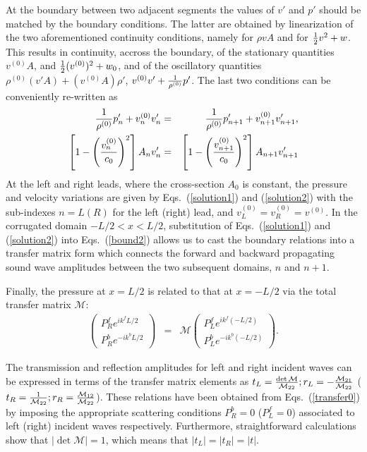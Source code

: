 \documentclass[aps,prl,twocolumn,groupedaddress,amsmath,amssymb]{revtex4}
\begin{document}
At the boundary between two adjacent segments the values of $v'$ and $p'$ should be matched by the boundary conditions. The latter are
obtained by linearization of the two aforementioned continuity conditions, namely for $\rho vA$ and for ${1\over 2} v^2+w$. This results
in continuity, accross the boundary, of the stationary quantities $v^{(0)} A $, and ${1\over 2} (v^{(0)})^2+w_0$, and of the oscillatory quantities
$\rho^{(0)} (v' A)+(v^{(0)} A) \rho'$, $v^{(0)}v'+{1\over \rho^{(0)}} p'$. The last two conditions can be conveniently re-written as
\begin{eqnarray}
\label{bound2}
{1\over \rho^{(0)}} p_n' + v_n^{(0)} v_n' &=& {1\over \rho^{(0)}} p_{n+1}' + v_{n+1}^{(0)} v_{n+1}', \\
\left[1-\left({v_{n}^{(0)}\over c_0}\right)^2\right] A_n v_n' &=& \left[1-\left({v_{n+1}^{(0)}\over c_0}\right)^2\right] A_{n+1} v_{n+1}' \nonumber
\end{eqnarray}
At the left and right leads, where the cross-section $A_0$ is constant, the pressure and velocity variations are given
by Eqs.~(\ref{solution1}) and (\ref{solution2}) with the sub-indexes $n=L(R)$ for the left (right) lead, and $v_L^{(0)}=v_R^{(0)}=v^{(0)}$.
In the corrugated domain $-L/2<x<L/2$, substitution of Eqs.~(\ref{solution1}) and (\ref{solution2}) into Eqs.~(\ref{bound2}) allows us to cast the 
boundary relations into a transfer matrix form which connects the forward and backward propagating sound wave amplitudes 
between the two subsequent domains, $n$ and $n+1$.

Finally, the pressure at $x=L/2$ is related to that at $x=-L/2$ via the total transfer matrix ${\mathcal M}$:
\begin{eqnarray}  \label{transfer0}
\left(\begin{array}{c}
P_{R}^{f} e^{ik^f L/2}  \\
P_{R}^{b} e^{-ik^b L/2} \end{array}
\right) & = & \mathcal{M} \left(\begin{array}{c}
P_{L}^{f} e^{ik^f (-L/2)}   \\
P_{L}^{b} e^{-ik^b (-L/2)} \end{array}
\right).
\end{eqnarray}

The transmission and reflection amplitudes for left and right incident waves can be expressed in terms of the transfer matrix elements as
$t_L={\det{\mathcal M}\over {\mathcal M}_{22}}; r_L=-{{\mathcal M}_{21}\over {\mathcal M}_{22}}$ ($t_R={1\over {\mathcal M}_{22}}; r_R=
{{\mathcal M}_{12}\over {\mathcal M}_{22}}$). These relations have been obtained from Eqs.~(\ref{transfer0}) by imposing the appropriate 
scattering conditions $P_R^b=0$ ($P_L^f=0$) associated to left (right) incident waves respectively. Furthermore, straightforward calculations 
show that $|\det{\mathcal M}|=1$,  which means that $|t_L|=|t_R|=|t|$.
\end{document}
